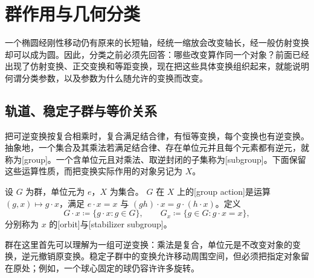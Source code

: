 
% 
% 
% 

\section{群作用与几何分类}
\label{g1:sec:0104}

一个椭圆经刚性移动仍有原来的长短轴，经统一缩放会改变轴长，经一般仿射变换却可以成为圆。因此，分类之前必须先回答：哪些改变算作同一个对象？前面已经出现了仿射变换、正交变换和等距变换，现在把这些具体变换组织起来，就能说明何谓分类参数，以及参数为什么随允许的变换而改变。

\subsection{轨道、稳定子群与等价关系}
\label{g1:subsec:0104:01}

把可逆变换按复合相乘时，复合满足结合律，有恒等变换，每个变换也有逆变换。抽象地，一个集合及其乘法若满足结合律、存在单位元并且每个元素都有逆元，就称为[group]。一个含单位元且对乘法、取逆封闭的子集称为[subgroup]。下面保留这些运算性质，而把变换实际作用的对象另记为 \(X\)。

\begin{definition}\label{g1:def:group-action}
	设 \(G\) 为群，单位元为 \(e\)，\(X\) 为集合。 \(G\) 在 \(X\) 上的[group action]是运算 \((g,x)\mapsto g\cdot x\)，满足 \(e\cdot x=x\) 与 \((gh)\cdot x=g\cdot(h\cdot x)\)。定义
	\[
		G\cdot x\coloneqq\{g\cdot x:g\in G\},\qquad
		G_x\coloneqq\{g\in G:g\cdot x=x\},
	\]
	分别称为 \(x\) 的[orbit]与[stabilizer subgroup]。
\end{definition}

群在这里首先可以理解为一组可逆变换：乘法是复合，单位元是不改变对象的变换，逆元撤销原变换。稳定子群中的变换允许移动周围空间，但必须把指定对象留在原处；例如，一个球心固定的球仍容许许多旋转。

